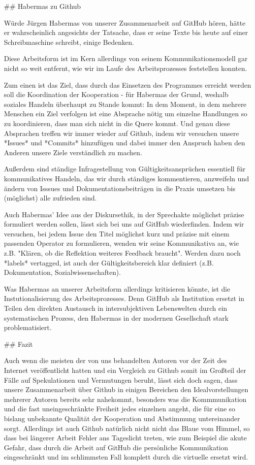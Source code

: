 ## Habermas zu Github

Würde Jürgen Habermas von unserer Zusammenarbeit auf GitHub hören, hätte er wahrscheinlich angesichts der Tatsache, dass er seine Texte bis heute auf einer Schreibmaschine schreibt, einige Bedenken.

Diese Arbeitsform ist im Kern allerdings von seinem Kommunikationsmodell gar nicht so weit entfernt, wie  wir im Laufe des Arbeitsprozesses feststellen konnten.

Zum einen ist das Ziel, dass durch das Einsetzen des Programmes erreicht werden soll die Koordination der Kooperation - für Habermas der Grund, weshalb soziales Handeln überhaupt zu Stande kommt:
In dem Moment, in dem mehrere Menschen ein Ziel verfolgen ist eine Absprache nötig um einzelne Handlungen so zu koordinieren, dass man sich nicht in die Quere kommt.
Und genau diese Absprachen treffen wir immer wieder auf Github, indem wir versuchen unsere *Issues* und *Commits* hinzufügen und dabei immer den Anspruch haben den Anderen unsere Ziele verständlich zu machen.

Außerdem sind ständige Infragestellung von Gültigkeitsansprüchen essentiell für kommunikatives Handeln, das wir durch ständiges kommentieren, anzweifeln und ändern von Isssues und Dokumentationsbeiträgen in die Praxis umsetzen bis (möglichst) alle zufrieden sind.

Auch Habermas' Idee aus der Diskursethik, in der Sprechakte möglichst präzise formuliert werden sollen, lässt sich bei uns auf GitHub wiederfinden.
Indem wir versuchen, bei jedem Issue den Titel möglichst kurz und präzise mit einem passenden Operator zu formulieren, wenden wir seine Kommunikativa an, wie z.B. "Klären, ob die Reflektion weiteres Feedback braucht".
Werden dazu noch *labels* vertagged, ist auch der Gültigkeitsbereich klar definiert (z.B. Dokumentation, Sozialwissenschaften).

Was Habermas an unserer Arbeitsform allerdings kritisieren könnte, ist die Instutionalisierung des Arbeitsprozesses.
Denn GitHub als Institution ersetzt in Teilen den direkten Austausch in intersubjektiven Lebenswelten durch ein systematischen Prozess, den Habermas in der modernen Gesellschaft stark problematisiert.


## Fazit

Auch wenn die meisten der von uns behandelten Autoren vor der Zeit des Internet veröffentlicht hatten und ein Vergleich zu Github somit im Großteil der Fälle auf Spekulationen und Vermutungen beruht, lässt sich doch sagen, dass unsere Zusammenarbeit über Github in einigen Bereichen den Idealvorstellungen mehrerer Autoren bereits sehr nahekommt, besonders was die Kommmunikation und die fast uneingeschränkte Freiheit jedes einzelnen angeht, die für eine so bislang unbekannte Qualität der Kooperation und Abstimmung untereinander sorgt.
Allerdings ist auch Github natürlich nicht nicht das Blaue vom Himmel, so dass bei längerer Arbeit Fehler ans Tageslicht treten, wie zum Beispiel die akute Gefahr, dass durch die Arbeit auf GitHub die persönliche Kommunikation eingeschränkt und im schlimmsten Fall komplett durch die virtuelle ersetzt wird.
